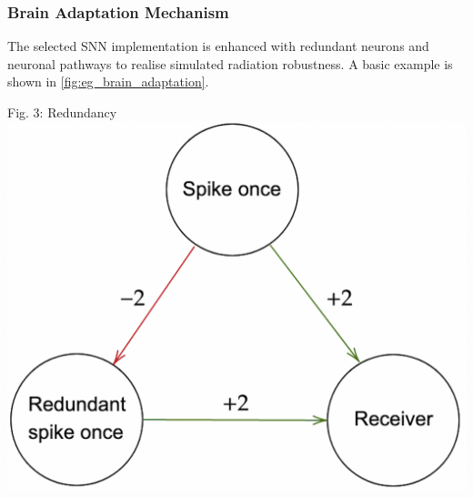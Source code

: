 \subsubsection{Brain Adaptation Mechanism}\label{subsubsec:brain_adaptation_mechanisms}
The selected SNN implementation is enhanced with redundant neurons and neuronal pathways to realise simulated radiation robustness. A basic example is shown in \cref{fig:eg_brain_adaptation}.
\begin{rudifig}{\hsize}{Fig. 3: Redundancy}
    \hspace{-1em}
    \includegraphics[width=700pt]{latex/Images/brain_adaptation_alternative.png}
    \label{fig:eg_brain_adaptation}
\end{rudifig}


